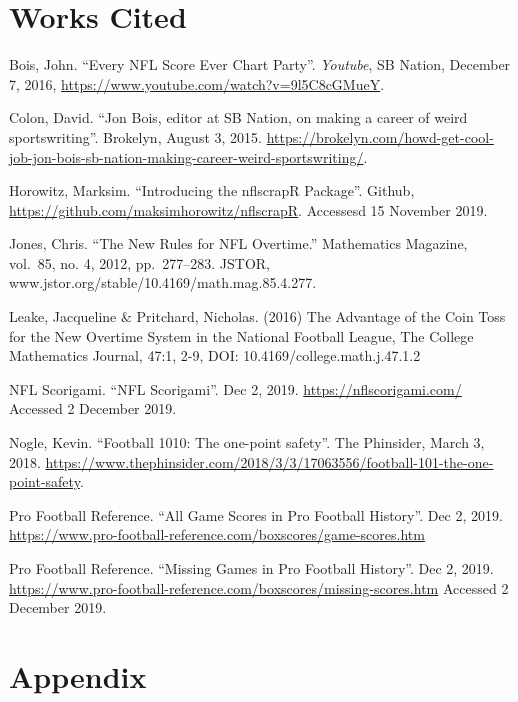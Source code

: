 \documentclass[
]{article}
\begin{document}
\hypertarget{works-cited}{%
\section{Works Cited}\label{works-cited}}

Bois, John. ``Every NFL Score Ever \textbar{} Chart Party''.
\emph{Youtube}, SB Nation, December 7, 2016,
\url{https://www.youtube.com/watch?v=9l5C8cGMueY}.

Colon, David. ``Jon Bois, editor at SB Nation, on making a career of
weird sportswriting''. Brokelyn, August 3, 2015.
\url{https://brokelyn.com/howd-get-cool-job-jon-bois-sb-nation-making-career-weird-sportswriting/}.

Horowitz, Marksim. ``Introducing the nflscrapR Package''. Github,
\url{https://github.com/maksimhorowitz/nflscrapR}. Accessesd 15 November
2019.

Jones, Chris. ``The New Rules for NFL Overtime.'' Mathematics Magazine,
vol.~85, no. 4, 2012, pp.~277--283. JSTOR,
www.jstor.org/stable/10.4169/math.mag.85.4.277.

Leake, Jacqueline \& Pritchard, Nicholas. (2016) The Advantage of the
Coin Toss for the New Overtime System in the National Football League,
The College Mathematics Journal, 47:1, 2-9, DOI:
10.4169/college.math.j.47.1.2

NFL Scorigami. ``NFL Scorigami''. Dec 2, 2019.
\url{https://nflscorigami.com/} Accessed 2 December 2019.

Nogle, Kevin. ``Football 1010: The one-point safety''. The Phinsider,
March 3, 2018.
\url{https://www.thephinsider.com/2018/3/3/17063556/football-101-the-one-point-safety}.

Pro Football Reference. ``All Game Scores in Pro Football History''. Dec
2, 2019.
\url{https://www.pro-football-reference.com/boxscores/game-scores.htm}

Pro Football Reference. ``Missing Games in Pro Football History''. Dec
2, 2019.
\url{https://www.pro-football-reference.com/boxscores/missing-scores.htm}
Accessed 2 December 2019.

\hypertarget{appendix}{%
\section{Appendix}\label{appendix}}
\end{document}
